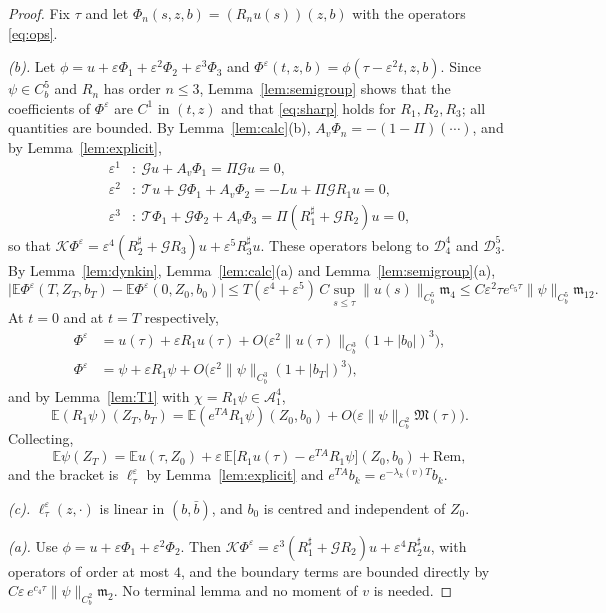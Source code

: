 \documentclass[11pt]{article}
\newcommand{\E}{\mathbb{E}}
\newcommand{\eps}{\varepsilon}
\newcommand{\cT}{\mathcal{T}}
\newcommand{\cG}{\mathcal{G}}
\newcommand{\cK}{\mathcal{K}}
\newcommand{\cA}{\mathcal{A}}
\newcommand{\cD}{\mathcal{D}}
\newcommand{\fm}{\mathfrak{m}}
\newcommand{\fM}{\mathfrak{M}}
\newcommand{\nrm}[2]{\|#1\|_{#2}}
\theoremstyle{remark}
\begin{document}
\begin{proof}
Fix $\tau$ and let $\Phi_n(s,z,b)=(R_nu(s))(z,b)$ with the operators
\eqref{eq:ops}.

\emph{(b).} Let $\phi=u+\eps\Phi_1+\eps^2\Phi_2+\eps^3\Phi_3$ and
$\Phi^\eps(t,z,b)=\phi(\tau-\eps^2t,z,b)$. Since $\psi\in C_b^5$ and
$R_n$ has order $n\le3$, Lemma~\ref{lem:semigroup} shows that the
coefficients of $\Phi^\eps$ are $C^1$ in $(t,z)$ and that \eqref{eq:sharp}
holds for $R_1,R_2,R_3$; all quantities are bounded. By
Lemma~\ref{lem:calc}(b), $A_v\Phi_n=-(1-\Pi)(\cdots)$, and by
Lemma~\ref{lem:explicit},
\begin{align*}
  \eps^1&:\ \cG u+A_v\Phi_1=\Pi\cG u=0,\\
  \eps^2&:\ \cT u+\cG\Phi_1+A_v\Phi_2=-Lu+\Pi\cG R_1u=0,\\
  \eps^3&:\ \cT\Phi_1+\cG\Phi_2+A_v\Phi_3=\Pi(R_1^\sharp+\cG R_2)u=0,
\end{align*}
so that
$\cK\Phi^\eps=\eps^4(R_2^\sharp+\cG R_3)u+\eps^5R_3^\sharp u$. These
operators belong to $\cD_4^4$ and $\cD_3^5$. By Lemma~\ref{lem:dynkin},
Lemma~\ref{lem:calc}(a) and Lemma~\ref{lem:semigroup}(a),
\[
  \bigl|\E\Phi^\eps(T,Z_T,b_T)-\E\Phi^\eps(0,Z_0,b_0)\bigr|
  \le T(\eps^4+\eps^5)\,C\sup_{s\le\tau}\nrm{u(s)}{C_b^5}\fm_4
  \le C\eps^2\tau e^{c_5\tau}\nrm{\psi}{C_b^5}\fm_{12}.
\]
At $t=0$ and at $t=T$ respectively,
\begin{align*}
  \Phi^\eps&=u(\tau)+\eps R_1u(\tau)
     +O\bigl(\eps^2\nrm{u(\tau)}{C_b^3}(1+|b_0|)^3\bigr),\\
  \Phi^\eps&=\psi+\eps R_1\psi
     +O\bigl(\eps^2\nrm{\psi}{C_b^3}(1+|b_T|)^3\bigr),
\end{align*}
and by Lemma~\ref{lem:T1} with $\chi=R_1\psi\in\cA_1^4$,
\[
  \E(R_1\psi)(Z_T,b_T)=\E(e^{TA}R_1\psi)(Z_0,b_0)
    +O\bigl(\eps\nrm{\psi}{C_b^2}\fM(\tau)\bigr).
\]
Collecting,
\[
  \E\psi(Z_T)=\E u(\tau,Z_0)+\eps\,\E\bigl[R_1u(\tau)-e^{TA}R_1\psi\bigr](Z_0,b_0)
  +\mathrm{Rem},
\]
and the bracket is $\ell^\eps_\tau$ by Lemma~\ref{lem:explicit} and
$e^{TA}b_k=e^{-\lambda_k(v)T}b_k$.

\emph{(c).} $\ell^\eps_\tau(z,\cdot)$ is linear in $(b,\bar b)$, and $b_0$
is centred and independent of $Z_0$.

\emph{(a).} Use $\phi=u+\eps\Phi_1+\eps^2\Phi_2$. Then
$\cK\Phi^\eps=\eps^3(R_1^\sharp+\cG R_2)u+\eps^4R_2^\sharp u$, with
operators of order at most $4$, and the boundary terms are bounded
directly by $C\eps\,e^{c_4\tau}\nrm{\psi}{C_b^2}\fm_2$. No terminal lemma
and no moment of $v$ is needed.
\end{proof}
\end{document}
